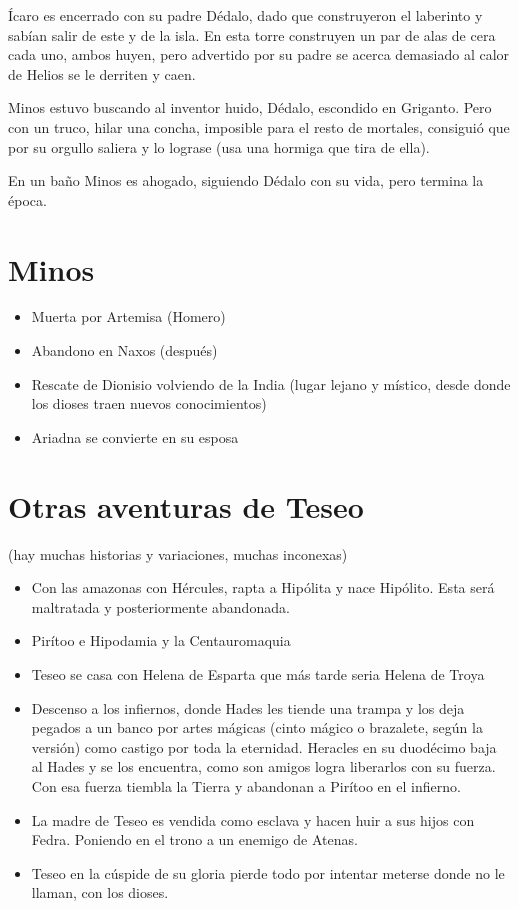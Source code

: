 Ícaro es encerrado con su padre Dédalo, dado que construyeron el laberinto y sabían salir de este y de la isla. En esta torre construyen un par de alas de cera cada uno, ambos huyen, pero advertido por su padre se acerca demasiado al calor de Helios se le derriten y caen. 

Minos estuvo buscando al inventor huido, Dédalo, escondido en Griganto. Pero con un truco, hilar una concha, imposible para el resto de mortales, consiguió que por su orgullo saliera y lo lograse (usa una hormiga que tira de ella). 

En un baño Minos es ahogado, siguiendo Dédalo con su vida, pero termina la época.

\section{Minos}
\begin{itemize}
    \item Muerta por Artemisa (Homero)
    \item Abandono en Naxos (después)
    \item Rescate de Dionisio volviendo de la India (lugar lejano y místico, desde donde los dioses traen nuevos conocimientos)
    \item Ariadna se convierte en su esposa
\end{itemize}

\section{Otras aventuras de Teseo }
(hay muchas historias y variaciones, muchas inconexas)
\begin{itemize}
    \item Con las amazonas con Hércules, rapta a Hipólita y nace Hipólito. Esta será maltratada y posteriormente abandonada.
    \item Pirítoo e Hipodamia y la Centauromaquia
    \item Teseo se casa con Helena de Esparta que más tarde seria Helena de Troya
    \item Descenso a los infiernos, donde Hades les tiende una trampa y los deja pegados a un banco por artes mágicas (cinto mágico o brazalete, según la versión) como castigo por toda la eternidad. Heracles en su duodécimo baja al Hades y se los encuentra, como son amigos logra liberarlos con su fuerza. Con esa fuerza tiembla la Tierra y abandonan a Pirítoo en el infierno.
    \item La madre de Teseo es vendida como esclava y hacen huir a sus hijos con Fedra. Poniendo en el trono a un enemigo de Atenas.
    \item Teseo en la cúspide de su gloria pierde todo por intentar meterse donde no le llaman, con los dioses.
\end{itemize}
